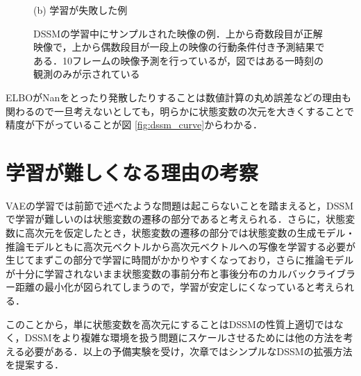 \begin{figure}[tp]
\begin{minipage}{0.48\hsize}
\begin{center}
      \caption{(b) 学習が失敗した例}
    \end{center}
  \end{minipage}
  \label{fig:dssm_base}
  \caption[DSSMの学習中にサンプルされた映像の例]{DSSMの学習中にサンプルされた映像の例．上から奇数段目が正解映像で，上から偶数段目が一段上の映像の行動条件付き予測結果である．10フレームの映像予測を行っているが，図ではある一時刻の観測のみが示されている}
\end{figure}

ELBOがNanをとったり発散したりすることは数値計算の丸め誤差などの理由も関わるので一旦考えないとしても，明らかに状態変数の次元を大きくすることで精度が下がっていることが図 \ref{fig:dssm_curve}からわかる．

\section{学習が難しくなる理由の考察}
VAEの学習では前節で述べたような問題は起こらないことを踏まえると，DSSMで学習が難しいのは状態変数の遷移の部分であると考えられる．さらに，状態変数に高次元を仮定したとき，状態変数の遷移の部分では状態変数の生成モデル・推論モデルともに高次元ベクトルから高次元ベクトルへの写像を学習する必要が生じてまずこの部分で学習に時間がかかりやすくなっており，さらに推論モデルが十分に学習されないまま状態変数の事前分布と事後分布のカルバックライブラー距離の最小化が図られてしまうので，学習が安定しにくなっていると考えられる．

このことから，単に状態変数を高次元にすることはDSSMの性質上適切ではなく，DSSMをより複雑な環境を扱う問題にスケールさせるためには他の方法を考える必要がある．以上の予備実験を受け，次章ではシンプルなDSSMの拡張方法を提案する．
